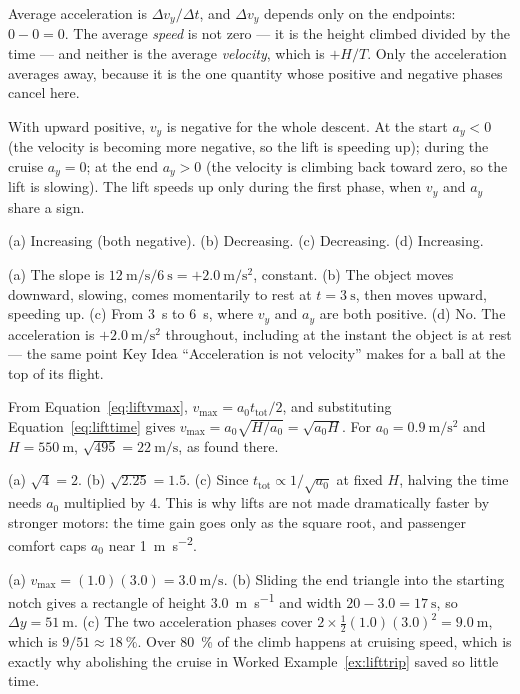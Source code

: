 \documentclass[11pt,twoside,openany]{book}
\begin{document}
\begin{description}[leftmargin=2.6em,itemsep=3pt,style=sameline]
  \item[2.60] Average acceleration is $\Delta v_y/\Delta t$, and $\Delta v_y$ depends only on the endpoints: $0 - 0 = 0$. The average \emph{speed} is not zero --- it is the height climbed divided by the time --- and neither is the average \emph{velocity}, which is $+H/T$. Only the acceleration averages away, because it is the one quantity whose positive and negative phases cancel here.
  \item[2.61] With upward positive, $v_y$ is negative for the whole descent. At the start $a_y < 0$ (the velocity is becoming more negative, so the lift is speeding up); during the cruise $a_y = 0$; at the end $a_y > 0$ (the velocity is climbing back toward zero, so the lift is slowing). The lift speeds up only during the first phase, when $v_y$ and $a_y$ share a sign.
  \item[2.62] (a) Increasing (both negative). (b) Decreasing. (c) Decreasing. (d) Increasing.
  \item[2.63] (a) The slope is $\SI{12}{\metre\per\second}/\SI{6}{\second} = +\SI{2.0}{\metre\per\second\squared}$, constant. (b) The object moves downward, slowing, comes momentarily to rest at $t = \SI{3}{\second}$, then moves upward, speeding up. (c) From \SI{3}{\second} to \SI{6}{\second}, where $v_y$ and $a_y$ are both positive. (d) No. The acceleration is $+\SI{2.0}{\metre\per\second\squared}$ throughout, including at the instant the object is at rest --- the same point Key Idea ``Acceleration is not velocity'' makes for a ball at the top of its flight.
  \item[2.64] From Equation~\eqref{eq:liftvmax}, $v_{\max} = a_0 t_{\text{tot}}/2$, and substituting Equation~\eqref{eq:lifttime} gives $v_{\max} = a_0\sqrt{H/a_0} = \sqrt{a_0 H}$. For $a_0 = \SI{0.9}{\metre\per\second\squared}$ and $H = \SI{550}{\metre}$, $\sqrt{495} = \SI{22}{\metre\per\second}$, as found there.
  \item[2.65] (a) $\sqrt4 = 2$. (b) $\sqrt{2.25} = 1.5$. (c) Since $t_{\text{tot}} \propto 1/\sqrt{a_0}$ at fixed $H$, halving the time needs $a_0$ multiplied by \num{4}. This is why lifts are not made dramatically faster by stronger motors: the time gain goes only as the square root, and passenger comfort caps $a_0$ near \SI{1}{\metre\per\second\squared}.
  \item[2.66] (a) $v_{\max} = (1.0)(3.0) = \SI{3.0}{\metre\per\second}$. (b) Sliding the end triangle into the starting notch gives a rectangle of height \SI{3.0}{\metre\per\second} and width $20 - 3.0 = \SI{17}{\second}$, so $\Delta y = \SI{51}{\metre}$. (c) The two acceleration phases cover $2 \times \tfrac12(1.0)(3.0)^2 = \SI{9.0}{\metre}$, which is $9/51 \approx \SI{18}{\percent}$. Over \SI{80}{\percent} of the climb happens at cruising speed, which is exactly why abolishing the cruise in Worked Example~\ref{ex:lifttrip} saved so little time.

\end{description}
\end{document}
